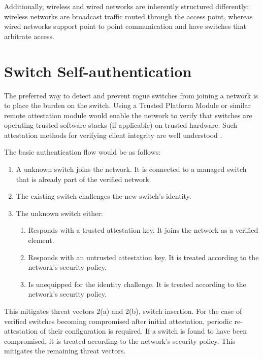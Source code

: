 \documentclass[journal]{IEEEtran}
\begin{document}
Additionally, wireless and wired networks are inherently structured differently: wireless networks
are broadcast traffic routed through the access point, whereas wired networks support point to
point communication and have switches that arbitrate access.



\section{Switch Self-authentication}
The preferred way to detect and prevent rogue switches from joining a network is to place the
burden on the switch. Using a Trusted Platform Module or similar remote attestation module would
enable the network to verify that switches are operating trusted software stacks (if applicable) on
trusted hardware. Such attestation methods for verifying client integrity are well understood
\cite{b6}.

The basic authentication flow would be as follows:
\begin{enumerate}
  \item A unknown switch joins the network. It is connected to a managed switch that is already
  part of the verified network.
  \item The existing switch challenges the new switch's identity.
  \item The unknown switch either:
  \begin{enumerate}
    \item Responds with a trusted attestation key. It joins the network as a verified element.
    \item Responds with an untrusted attestation key. It is treated according to the network's
    security policy.
    \item Is unequipped for the identity challenge. It is treated according to the network's
    security policy.
  \end{enumerate}
\end{enumerate}

This mitigates threat vectors 2(a) and 2(b), switch insertion. For the case of verified switches
becoming compromised after initial attestation, periodic re-attestation of their configuration is
required. If a switch is found to have been compromised, it is treated according to the network's
security policy. This mitigates the remaining threat vectors.
\end{document}
